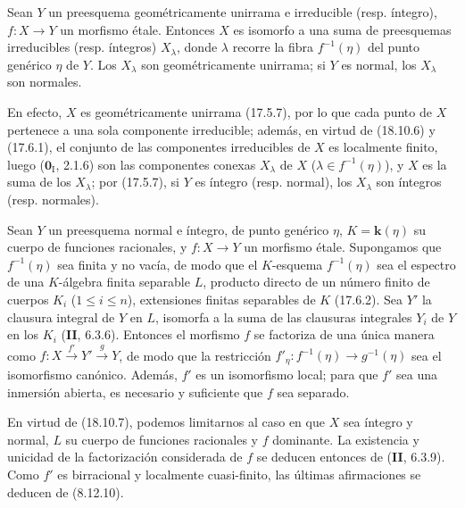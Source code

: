 \begin{proposition}[18.10.7]
\label{IV.18.10.7}
Sean $Y$ un preesquema geométricamente unirrama e irreducible \textup{(resp.} íntegro\textup{)}, $f:X\to Y$ un morfismo étale. Entonces $X$ es isomorfo a una suma de preesquemas irreducibles \textup{(resp.} íntegros\textup{)} $X_\lambda$, donde $\lambda$ recorre la fibra $f^{-1}(\eta)$ del punto genérico $\eta$ de $Y$. Los $X_\lambda$ son geométricamente unirrama; si $Y$ es normal, los $X_\lambda$ son normales.
\end{proposition}

En efecto, $X$ es geométricamente unirrama (17.5.7), por lo que cada punto de $X$ pertenece a una sola componente irreducible; además, en virtud de (18.10.6) y (17.6.1), el conjunto de las componentes irreducibles de $X$ es localmente finito, luego ($\mathbf 0_{\mathrm I}$, 2.1.6) son las componentes conexas $X_\lambda$ de $X$ ($\lambda\in f^{-1}(\eta)$), y $X$ es la suma de los $X_\lambda$; por (17.5.7), si $Y$ es íntegro (resp. normal), los $X_\lambda$ son íntegros (resp. normales).

\begin{proposition}[18.10.8]
\label{IV.18.10.8}
Sean $Y$ un preesquema normal e íntegro, de punto genérico $\eta$, $K=\boldsymbol k(\eta)$ su cuerpo de funciones racionales, y $f:X\to Y$ un morfismo étale. Supongamos que $f^{-1}(\eta)$ sea finita y no vacía, de modo que el $K$-esquema $f^{-1}(\eta)$ sea el espectro de una $K$-álgebra finita separable $L$, producto directo de un número finito de cuerpos $K_i$ \textup{($1\leq i\leq n$)}, extensiones finitas separables de $K$ \textup{(17.6.2)}. Sea $Y'$ la clausura integral de $Y$ en $L$, isomorfa a la suma de las clausuras integrales $Y_i$ de $Y$ en los $K_i$ \textup{(\textbf{II}, 6.3.6)}. Entonces el morfismo $f$ se factoriza de una única manera como $f:X\xrightarrow{f'}Y'\xrightarrow{g}Y$, de modo que la restricción $f'_\eta:f^{-1}(\eta)\to g^{-1}(\eta)$ sea el isomorfismo canónico. Además, $f'$ es un isomorfismo local; para que $f'$ sea una inmersión abierta, es necesario y suficiente que $f$ sea separado.
\end{proposition}

En virtud de (18.10.7), podemos limitarnos al caso en que $X$ sea íntegro y normal, $L$ su cuerpo de funciones racionales y $f$ dominante. La existencia y unicidad de la factorización considerada de $f$ se deducen entonces de (\textbf{II}, 6.3.9). Como $f'$ es birracional y localmente cuasi-finito, las últimas afirmaciones se deducen de (8.12.10).

